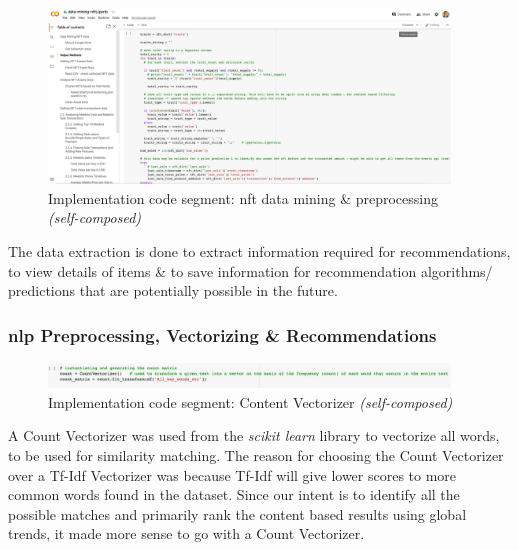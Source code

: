\begin{figure}[h!]
\centering
\includegraphics[width=0.95\textwidth]{images/Implementation/code/nft-data-extraction.png}
\caption{Implementation code segment: \gls{nft} data mining \& preprocessing \textit{(self-composed)}}
\label{fig:code-nft-data-mining}
\end{figure}

\vspace{-6mm}
The data extraction is done to extract information required for recommendations, to view details of items \& to save information for recommendation algorithms/ predictions that are potentially possible in the future.

\subsubsection{\gls{nlp} Preprocessing, Vectorizing \& Recommendations}

\begin{figure}[h!]
\centering
\includegraphics[width=0.95\textwidth]{images/Implementation/code/content vectorizer.png}
\caption{Implementation code segment: Content Vectorizer \textit{(self-composed)}}
\label{fig:code-content-vectorizer}
\end{figure}

A Count Vectorizer was used from the \textit{scikit learn} library to vectorize all words, to be used for similarity matching. The reason for choosing the Count Vectorizer over a Tf-Idf Vectorizer was because Tf-Idf will give lower scores to more common words found in the dataset. Since our intent is to identify all the possible matches and primarily rank the content based results using global trends, it made more sense to go with a Count Vectorizer.


